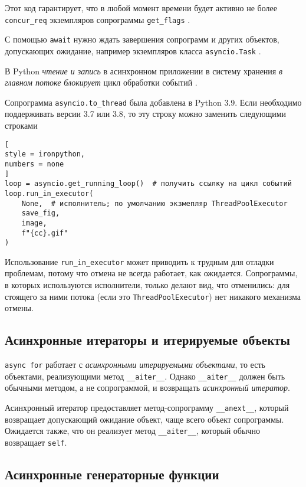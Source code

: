 \documentclass[%
	11pt,
	a4paper,
	utf8,
		]{article}
\begin{document}
Этот код гарантирует, что в любой момент времени будет активно не более \verb|concur_req| экземпляров сопрограммы \verb*|get_flags| \cite[]{ramalho:python-2022}.

С помощью \verb|await| нужно ждать завершения сопрограмм и других объектов, допускающих ожидание, например экземпляров класса \verb*|asyncio.Task| \cite[]{ramalho:python-2022}.

В Python \emph{чтение и запись} в асинхронном приложении в систему хранения \emph{в главном потоке} \emph{\color{red}блокирует} цикл обработки событий \cite[]{ramalho:python-2022}.

Сопрограмма \verb|asyncio.to_thread| была добавлена в Python 3.9. Если необходимо поддерживать версии 3.7 или 3.8, то эту строку можно заменить следующими строками \cite[]{ramalho:python-2022}
\begin{lstlisting}[
style = ironpython,
numbers = none
]
loop = asyncio.get_running_loop()  # получить ссылку на цикл событий
loop.run_in_executor(
    None,  # исполнитель; по умолчанию экзмепляр ThreadPoolExecutor
    save_fig,
    image,
    f"{cc}.gif"
)
\end{lstlisting}

Использование \verb*|run_in_executor| может приводить к трудным для отладки проблемам, потому что отмена не всегда работает, как ожидается. Сопрограммы, в которых используются исполнители, только делают вид, что отменились: для стоящего за ними потока (если это \verb|ThreadPoolExecutor|) нет никакого механизма отмены.

\subsection{Асинхронные итераторы и итерируемые объекты}

\verb*|async for| работает с \emph{асинхронными итерируемыми объектами}, то есть объектами, реализующими метод \verb|__aiter__|. Однако \verb*|__aiter__| должен быть обычными методом, а не сопрограммой, и возвращать \emph{асинхронный итератор}.

Асинхронный итератор предоставляет метод-сопрограмму \verb|__anext__|, который возвращает допускающий ожидание объект, чаще всего объект сопрограммы. Ожидается также, что он реализует метод \verb*|__aiter__|, который обычно возвращает \verb|self|. 

\subsection{Асинхронные генераторные функции}
\end{document}
